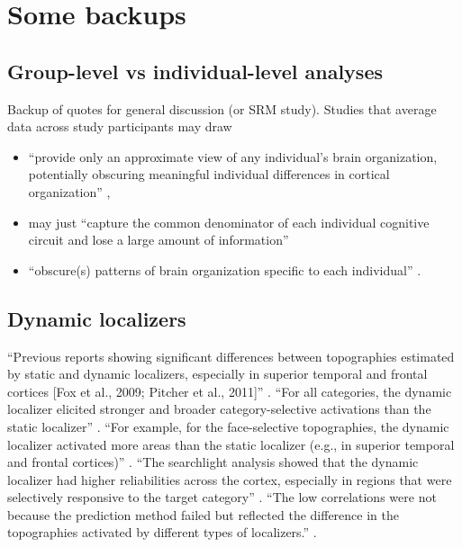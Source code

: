 \pagebreak


\section{Some backups}


\subsection{Group-level vs individual-level analyses}

Backup of quotes for general discussion (or SRM study).  Studies that average
data across study participants may draw

\begin{itemize}

\item ``provide only an approximate view of any individual's brain organization,
    potentially obscuring meaningful individual differences in cortical
        organization'' \citep{laumann2015functional},

\item may just ``capture the common denominator of each individual cognitive
    circuit and lose a large amount of information''

\item ``obscure(s) patterns of brain organization specific to each individual''
    \citep{laumann2015functional}.

\end{itemize}


\subsection{Dynamic localizers}
%
``Previous reports showing significant differences between topographies
estimated by static and dynamic localizers, especially in superior temporal and
frontal cortices [Fox et al., 2009; Pitcher et al., 2011]''
\citep{jiahui2022cross}.
%
``For all categories, the dynamic localizer elicited stronger and broader
category-selective activations than the static localizer''
\citep{jiahui2022cross}.
%
``For example, for the face-selective topographies, the dynamic localizer
activated more areas than the static localizer (e.g., in superior temporal and
frontal cortices)'' \citep{jiahui2022cross}.
%
``The searchlight analysis showed that the dynamic localizer had higher
reliabilities across the cortex, especially in regions that were selectively
responsive to the target category'' \citep{jiahui2022cross}.
%
``The low correlations were not because the prediction method failed but
reflected the difference in the topographies activated by different types of
localizers.'' \citep{jiahui2022cross}.


